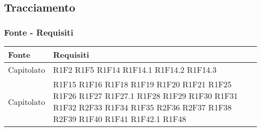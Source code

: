 \subsection{Tracciamento}
\subsubsection{Fonte - Requisiti}
\begin{center}
	\begin{longtable}{|p{44mm}|p{22mm}|}
		\hline
		\rowcolor{lighter-grayer}
		\textbf{Fonte} &  \textbf{Requisiti}  \\
		\hline
		\endhead
		
		
Capitolato &
R1F2 \newline
R1F5 \newline
R1F14 \newline
R1F14.1 \newline
R1F14.2 \newline
R1F14.3
\\
\hline
Capitolato &R1F15 \newline
R1F16 \newline
R1F18 \newline
R1F19 \newline
R1F20 \newline
R1F21 \newline
R1F25 \newline
R1F26 \newline
R1F27 \newline
R1F27.1 \newline
R1F28 \newline
R1F29 \newline
R1F30 \newline
R1F31 \newline
R1F32 \newline
R2F33 \newline
R1F34 \newline
R1F35 \newline
R2F36 \newline
R2F37 \newline
R1F38 \newline
R2F39 \newline
R1F40 \newline
R1F41 \newline
R1F42.1 \newline
R1F48 \newline

\end{longtable}
\end{center}
